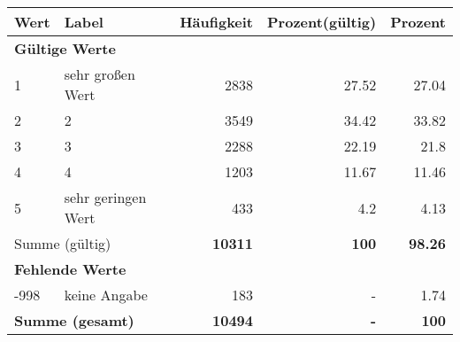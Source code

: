      \begin{longtable}{lXrrr}
     \toprule
     \textbf{Wert} & \textbf{Label} & \textbf{Häufigkeit} & \textbf{Prozent(gültig)} & \textbf{Prozent} \\
     \endhead
     \midrule
     \multicolumn{5}{l}{\textbf{Gültige Werte}}\\

     1 &
     \multicolumn{1}{X}{ sehr großen Wert   } &


       \num{2838} &
       \num[round-mode=places,round-precision=2]{27.52} &
         \num[round-mode=places,round-precision=2]{27.04} \\

     2 &
     \multicolumn{1}{X}{ 2   } &


       \num{3549} &
       \num[round-mode=places,round-precision=2]{34.42} &
         \num[round-mode=places,round-precision=2]{33.82} \\

     3 &
     \multicolumn{1}{X}{ 3   } &


       \num{2288} &
       \num[round-mode=places,round-precision=2]{22.19} &
         \num[round-mode=places,round-precision=2]{21.8} \\

     4 &
     \multicolumn{1}{X}{ 4   } &


       \num{1203} &
       \num[round-mode=places,round-precision=2]{11.67} &
         \num[round-mode=places,round-precision=2]{11.46} \\

     5 &
     \multicolumn{1}{X}{ sehr geringen Wert   } &


       \num{433} &
       \num[round-mode=places,round-precision=2]{4.2} &
         \num[round-mode=places,round-precision=2]{4.13} \\
     \midrule
     \multicolumn{2}{l}{Summe (gültig)} &
       \textbf{\num{10311}} &
     \textbf{\num{100}} &
       \textbf{\num[round-mode=places,round-precision=2]{98.26}} \\
     \multicolumn{5}{l}{\textbf{Fehlende Werte}}\\
       -998 &
       keine Angabe &
         \num{183} &
        - &
         \num[round-mode=places,round-precision=2]{1.74} \\
     \midrule
     \multicolumn{2}{l}{\textbf{Summe (gesamt)}} &
          \textbf{\num{10494}} &
        \textbf{-} &
        \textbf{\num{100}} \\
     \bottomrule
     \end{longtable}
     
